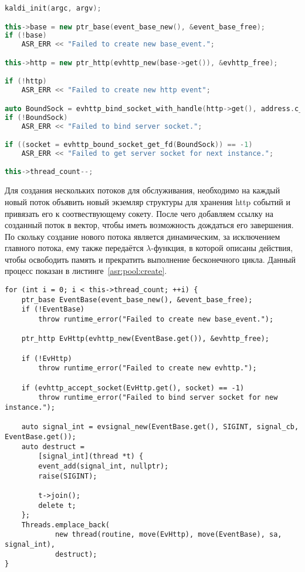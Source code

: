 \begin{lstlisting}[caption={Создание базовых объектов для инициализации подсистемы},label={asr:http:init},language=C++]
kaldi_init(argc, argv);

this->base = new ptr_base(event_base_new(), &event_base_free);
if (!base)
    ASR_ERR << "Failed to create new base_event.";

this->http = new ptr_http(evhttp_new(base->get()), &evhttp_free);

if (!http)
    ASR_ERR << "Failed to create new http event";

auto BoundSock = evhttp_bind_socket_with_handle(http->get(), address.c_str(), port);
if (!BoundSock)
    ASR_ERR << "Failed to bind server socket.";

if ((socket = evhttp_bound_socket_get_fd(BoundSock)) == -1)
    ASR_ERR << "Failed to get server socket for next instance.";

this->thread_count--;

\end{lstlisting}

Для создания нескольких потоков для обслуживания, необходимо на каждый новый поток
объявить новый экземляр структуры для хранения http событий и привязать его к
соотвествующему сокету. После чего добавляем ссылку на созданный поток в вектор,
чтобы иметь возможность дождаться его завершения. По скольку создание нового
потока является динамическим, за исключением главного потока, ему также
передаётся $\lambda$-функция, в которой описаны действия, чтобы освободить
память и прекратить выполнение бесконечного цикла. Данный процесс показан
в листинге~\ref{asr:pool:create}.

\begin{lstlisting}[caption={Создание потоков для обслуживания},label={asr:pool:create}]
for (int i = 0; i < this->thread_count; ++i) {
    ptr_base EventBase(event_base_new(), &event_base_free);
    if (!EventBase)
        throw runtime_error("Failed to create new base_event.");

    ptr_http EvHttp(evhttp_new(EventBase.get()), &evhttp_free);

    if (!EvHttp)
        throw runtime_error("Failed to create new evhttp.");

    if (evhttp_accept_socket(EvHttp.get(), socket) == -1)
        throw runtime_error("Failed to bind server socket for new instance.");

    auto signal_int = evsignal_new(EventBase.get(), SIGINT, signal_cb, EventBase.get());
    auto destruct =
        [signal_int](thread *t) {
        event_add(signal_int, nullptr);
        raise(SIGINT);

        t->join();
        delete t;
    };
    Threads.emplace_back(
            new thread(routine, move(EvHttp), move(EventBase), sa, signal_int),
            destruct);
}
\end{lstlisting}

